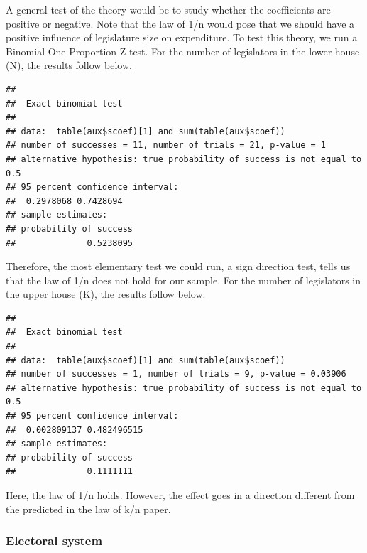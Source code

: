\documentclass[
]{article}
\begin{document}
A general test of the theory would be to study whether the coefficients
are positive or negative. Note that the law of 1/n would pose that we
should have a positive influence of legislature size on expenditure. To
test this theory, we run a Binomial One-Proportion Z-test. For the
number of legislators in the lower house (N), the results follow below.

\begin{verbatim}
## 
##  Exact binomial test
## 
## data:  table(aux$scoef)[1] and sum(table(aux$scoef))
## number of successes = 11, number of trials = 21, p-value = 1
## alternative hypothesis: true probability of success is not equal to 0.5
## 95 percent confidence interval:
##  0.2978068 0.7428694
## sample estimates:
## probability of success 
##              0.5238095
\end{verbatim}

Therefore, the most elementary test we could run, a sign direction test,
tells us that the law of 1/n does not hold for our sample. For the
number of legislators in the upper house (K), the results follow below.

\begin{verbatim}
## 
##  Exact binomial test
## 
## data:  table(aux$scoef)[1] and sum(table(aux$scoef))
## number of successes = 1, number of trials = 9, p-value = 0.03906
## alternative hypothesis: true probability of success is not equal to 0.5
## 95 percent confidence interval:
##  0.002809137 0.482496515
## sample estimates:
## probability of success 
##              0.1111111
\end{verbatim}

Here, the law of 1/n holds. However, the effect goes in a direction
different from the predicted in the law of k/n paper.

\newpage

\hypertarget{electoral-system}{%
\subsubsection{Electoral system}\label{electoral-system}}
\end{document}

